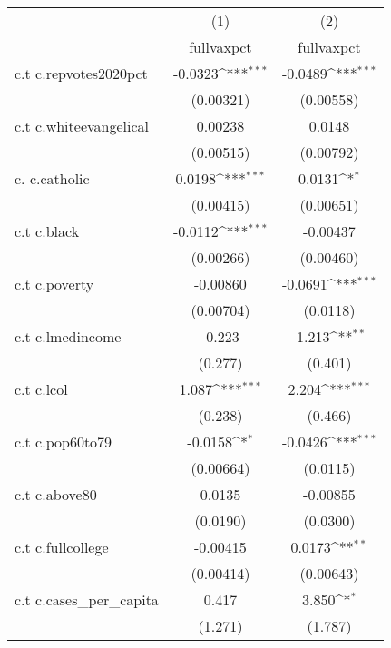 {
\def\sym#1{\ifmmode^{#1}\else\(^{#1}\)\fi}
\begin{tabular}{l*{2}{c}}
\hline\hline
            &\multicolumn{1}{c}{(1)}&\multicolumn{1}{c}{(2)}\\
            &\multicolumn{1}{c}{fullvaxpct}&\multicolumn{1}{c}{fullvaxpct}\\
\hline
c.t c.repvotes2020pct&     -0.0323\sym{***}&     -0.0489\sym{***}\\
            &   (0.00321)         &   (0.00558)         \\
[1em]
c.t c.whiteevangelical&     0.00238         &      0.0148         \\
            &   (0.00515)         &   (0.00792)         \\
[1em]
c. c.catholic&      0.0198\sym{***}&      0.0131\sym{*}  \\
            &   (0.00415)         &   (0.00651)         \\
[1em]
c.t c.black &     -0.0112\sym{***}&    -0.00437         \\
            &   (0.00266)         &   (0.00460)         \\
[1em]
c.t c.poverty&    -0.00860         &     -0.0691\sym{***}\\
            &   (0.00704)         &    (0.0118)         \\
[1em]
c.t c.lmedincome&      -0.223         &      -1.213\sym{**} \\
            &     (0.277)         &     (0.401)         \\
[1em]
c.t c.lcol  &       1.087\sym{***}&       2.204\sym{***}\\
            &     (0.238)         &     (0.466)         \\
[1em]
c.t c.pop60to79&     -0.0158\sym{*}  &     -0.0426\sym{***}\\
            &   (0.00664)         &    (0.0115)         \\
[1em]
c.t c.above80&      0.0135         &    -0.00855         \\
            &    (0.0190)         &    (0.0300)         \\
[1em]
c.t c.fullcollege&    -0.00415         &      0.0173\sym{**} \\
            &   (0.00414)         &   (0.00643)         \\
[1em]
c.t c.cases\_per\_capita&       0.417         &       3.850\sym{*}  \\
            &     (1.271)         &     (1.787)         \\

\end{tabular}}
